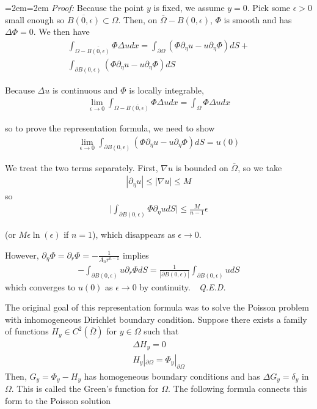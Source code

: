 \documentclass{article}
\newcommand{\cl}[1]{{\overline{#1}}}
\newcommand{\pd}{\partial}
\newenvironment{pf}{%
	\par%
	\medskip
	\leftskip=2em\rightskip=2em%
	\noindent\ignorespaces \textit{Proof:} \newline}{%
	\,\, \newline \textit{Q.E.D.}\par\medskip}
\begin{document}
	\begin{pf}
		Because the point $y$ is fixed, we assume $y=0$. Pick some $\epsilon > 0$ small enough so $\cl{B(0,\epsilon)} \subset \Omega$. Then, on $\cl{\Omega} - B(0,\epsilon)$, $\Phi$ is smooth and has $\Delta \Phi = 0$. We then have
		\begin{align*}
			\int_{\Omega-\cl{B(0,\epsilon)}} \Phi \Delta u dx = \int_{\pd \Omega} \left(\Phi \pd_{\eta} u - u \pd_{\eta} \Phi \right) dS + \\ \int_{\pd B(0,\epsilon)}  \left(\Phi \pd_{\eta} u - u \pd_{\eta} \Phi \right) dS 
		\end{align*}
		
		Because $\Delta u$ is continuous and $\Phi$ is locally integrable,
		\begin{align*}
			\lim_{\epsilon \to 0} \int_{\Omega-\cl{B(0,\epsilon)}} \Phi \Delta u dx  = \int_{\Omega} \Phi \Delta u dx
		\end{align*}
		
		so to prove the representation formula, we need to show 
		\begin{align*}
			\lim_{\epsilon \to 0} \int_{\pd B(0,\epsilon)}  \left(\Phi \pd_{\eta} u - u \pd_{\eta} \Phi \right) dS  = u(0)
		\end{align*}
		
		We treat the two terms separately. First, $\nabla u$ is bounded on $\cl{\Omega}$, so we take 
		\begin{align*}
			|\pd_{\eta} u| \leq | \nabla u | \leq M 
		\end{align*}
		so 
		\begin{align*}
			\lvert \int_{\pd B(0,\epsilon)} \Phi \pd_{\eta} u dS\rvert \leq \frac{M}{n-1} \epsilon 
		\end{align*}
		
		(or $M \epsilon \ln(\epsilon)$ if $n=1$), which disappears as $\epsilon \to 0$. 
		
		However, $\pd_{\eta} \Phi = \pd_{r} \Phi = -\frac{1}{A_{n}r^{n-1}}$ implies 
		\begin{align*}
			- \int_{\pd B(0,\epsilon)} u \pd_{r} \Phi dS = \frac{1}{|\pd B(0,\epsilon)|} \int_{\pd B(0,\epsilon)} u dS
		\end{align*}
		which converges to $u(0)$ as $\epsilon \to 0$ by continuity. 
	\end{pf}
	
	The original goal of this representation formula was to solve the Poisson problem with inhomogeneous Dirichlet boundary condition. Suppose there exists a family of functions $H_{y} \in C^{2}(\cl{\Omega})$ for $y \in \Omega$ such that 
	\begin{align*}
		\Delta H_{y} = 0 \\
		H_{y} |_{\pd \Omega} = \Phi_{y} |_{\pd \Omega}
	\end{align*}
	Then, $G_{y} = \Phi_{y} - H_{y}$ has homogeneous boundary conditions and has $\Delta G_{y} = \delta_{y}$ in $\Omega$. This is called the Green's function for $\Omega$. The following formula connects this form to the Poisson solution
	
\end{document}
